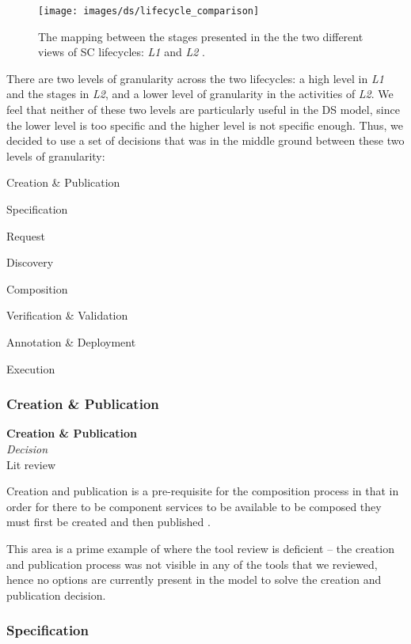 \begin{figure}[htb]
	\centering
	\texttt{[image: images/ds/lifecycle\_comparison]}
	\caption{The mapping between the stages presented in the the two different views of SC lifecycles: \emph{L1} \cite{Silva2008} and \emph{L2} \cite{Mehandjiev2012}.}
	\label{ds:fig:lifecyle_mapping}
\end{figure}

There are two levels of granularity across the two lifecycles: a high level in \emph{L1} and the stages in \emph{L2}, and a lower level of granularity in the activities of \emph{L2}. We feel that neither of these two levels are particularly useful in the DS model, since the lower level is too specific and the higher level is not specific enough. Thus, we decided to use a set of decisions that was in the middle ground between these two levels of granularity:
\begin{itemize*}
	\item Creation \& Publication
	\item Specification
	\item Request
	\item Discovery
	\item Composition
	\item Verification \& Validation
	\item Annotation \& Deployment
	\item Execution
\end{itemize*}

\subsubsection{Creation \& Publication}

\textbf{Creation \& Publication} \\ \emph{Decision} \\  Lit review \cite{Silva2008}

Creation and publication is a pre-requisite for the composition process in that in order for there to be component services to be available to be composed they must first be created and then published \cite{Silva2008}.

This area is a prime example of where the tool review is deficient -- the creation and publication process was not visible in any of the tools that we reviewed, hence no options are currently present in the model to solve the creation and publication decision.

\subsubsection{Specification} 

